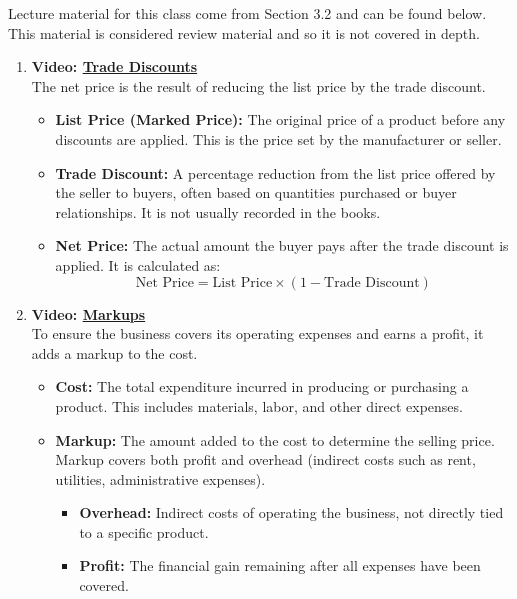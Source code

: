 \documentclass[
]{book}
\providecommand{\tightlist}{%
  \setlength{\itemsep}{0pt}\setlength{\parskip}{0pt}}
\begin{document}
Lecture material for this class come from Section 3.2 and can be found below. This material is considered review material and so it is not covered in depth.

\begin{enumerate}
\def\labelenumi{\arabic{enumi}.}
\tightlist
\item
  \textbf{Video: \href{https://youtu.be/NBrUqBwk5sE}{Trade Discounts}}\\
  The net price is the result of reducing the list price by the trade discount.

  \begin{itemize}
  \tightlist
  \item
    \textbf{List Price (Marked Price):} The original price of a product before any discounts are applied. This is the price set by the manufacturer or seller.
  \item
    \textbf{Trade Discount:} A percentage reduction from the list price offered by the seller to buyers, often based on quantities purchased or buyer relationships. It is not usually recorded in the books.
  \item
    \textbf{Net Price:} The actual amount the buyer pays after the trade discount is applied. It is calculated as:
    \[ \text{Net Price} = \text{List Price} \times (1 - \text{Trade Discount}) \]
  \end{itemize}
\item
  \textbf{Video: \href{https://youtu.be/IXx3Ix2rr8Y}{Markups}}\\
  To ensure the business covers its operating expenses and earns a profit, it adds a markup to the cost.

  \begin{itemize}
  \tightlist
  \item
    \textbf{Cost:} The total expenditure incurred in producing or purchasing a product. This includes materials, labor, and other direct expenses.
  \item
    \textbf{Markup:} The amount added to the cost to determine the selling price. Markup covers both profit and overhead (indirect costs such as rent, utilities, administrative expenses).

    \begin{itemize}
    \tightlist
    \item
      \textbf{Overhead:} Indirect costs of operating the business, not directly tied to a specific product.
    \item
      \textbf{Profit:} The financial gain remaining after all expenses have been covered.


\end{itemize}
\end{itemize}
\end{enumerate}
\end{document}
